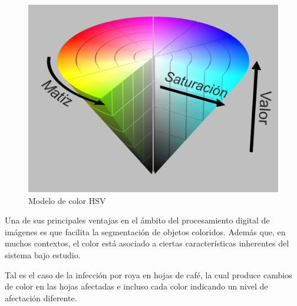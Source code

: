 \begin{figure}[H]
\centering
\includegraphics[scale=0.8]{images/hsv_model.png}
\caption{Modelo de color HSV}
\label{img:polygon}
\end{figure}

Una de sus principales ventajas en el ámbito del procesamiento digital de imágenes es que facilita la segmentación de objetos coloridos. Además que, en muchos contextos, el color está asociado a ciertas características inherentes del sistema bajo estudio.

Tal es el caso de la infección por roya en hojas de café, la cual produce cambios de color en las hojas afectadas e incluso cada color indicando un nivel de afectación diferente.